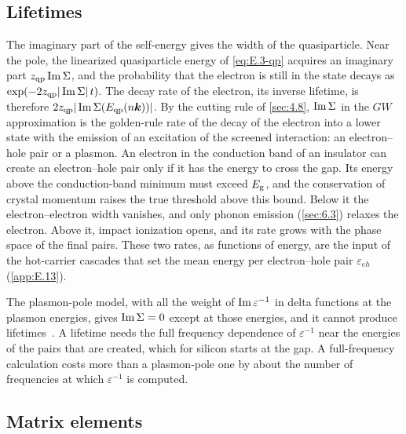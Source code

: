 \subsection{Lifetimes}

The imaginary part of the self-energy gives the width of the quasiparticle. Near the pole, the linearized quasiparticle energy of \cref{eq:E.3-qp} acquires an imaginary part $z_{\mathrm{qp}}\operatorname{Im}\Sigma$, and the probability that the electron is still in the state decays as $\exp(-2z_{\mathrm{qp}}|\operatorname{Im}\Sigma|\,t)$. The decay rate of the electron, its inverse lifetime, is therefore $2z_{\mathrm{qp}}|\operatorname{Im}\Sigma(E_{\mathrm{qp}}(n\bm{k}))|$. By the cutting rule of \cref{sec:4.8}, $\operatorname{Im}\Sigma$ in the $GW$ approximation is the golden-rule rate of the decay of the electron into a lower state with the emission of an excitation of the screened interaction: an electron--hole pair or a plasmon. An electron in the conduction band of an insulator can create an electron--hole pair only if it has the energy to cross the gap. Its energy above the conduction-band minimum must exceed $E_{\mathrm{g}}$, and the conservation of crystal momentum raises the true threshold above this bound. Below it the electron--electron width vanishes, and only phonon emission (\cref{sec:6.3}) relaxes the electron. Above it, impact ionization opens, and its rate grows with the phase space of the final pairs. These two rates, as functions of energy, are the input of the hot-carrier cascades that set the mean energy per electron--hole pair $\varepsilon_{eh}$ (\cref{app:E.13}).

The plasmon-pole model, with all the weight of $\operatorname{Im}\varepsilon^{-1}$ in delta functions at the plasmon energies, gives $\operatorname{Im}\Sigma = 0$ except at those energies, and it cannot produce lifetimes~\cite[Sect.~III\,C]{aryasetiawan1998gw}. A lifetime needs the full frequency dependence of $\varepsilon^{-1}$ near the energies of the pairs that are created, which for silicon starts at the gap. A full-frequency calculation costs more than a plasmon-pole one by about the number of frequencies at which $\varepsilon^{-1}$ is computed.

\subsection{Matrix elements}

